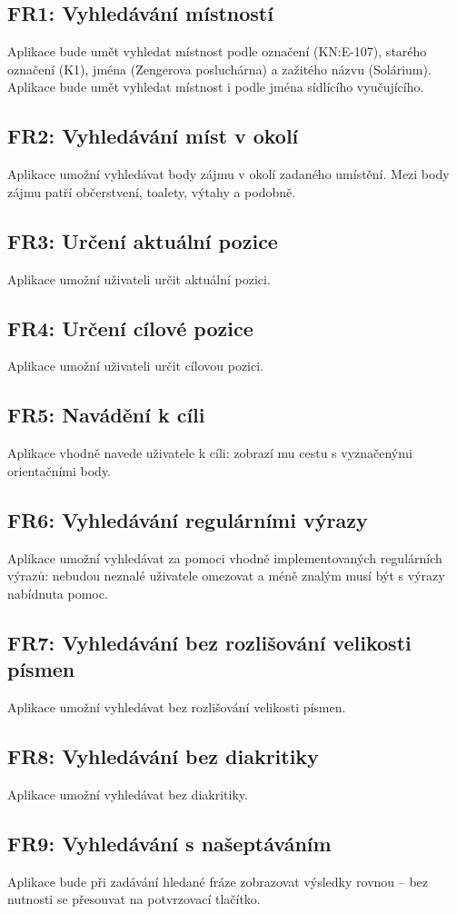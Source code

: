 \subsection{FR1: Vyhledávání místností}
Aplikace bude umět vyhledat místnost podle označení (KN:E-107), starého označení (K1), jména (Zengerova posluchárna) a zažitého názvu (Solárium). Aplikace bude umět vyhledat místnost i podle jména sídlícího vyučujícího.
\subsection{FR2: Vyhledávání míst v okolí}
Aplikace umožní vyhledávat body zájmu v okolí zadaného umístění. Mezi body zájmu patří občerstvení, toalety, výtahy a podobně.
\subsection{FR3: Určení aktuální pozice}
Aplikace umožní uživateli určit aktuální pozici.
\subsection{FR4: Určení cílové pozice}
Aplikace umožní uživateli určit cílovou pozici.
\subsection{FR5: Navádění k cíli}
Aplikace vhodně navede uživatele k cíli: zobrazí mu cestu s vyznačenými orientačními body.
\subsection{FR6: Vyhledávání regulárními výrazy}
Aplikace umožní vyhledávat za pomoci vhodně implementovaných regulárních výrazů: nebudou neznalé uživatele omezovat a méně znalým musí být s výrazy nabídnuta pomoc.
\subsection{FR7: Vyhledávání bez rozlišování velikosti písmen}
Aplikace umožní vyhledávat bez rozlišování velikosti písmen.
\subsection{FR8: Vyhledávání bez diakritiky}
Aplikace umožní vyhledávat bez diakritiky.
\subsection{FR9: Vyhledávání s našeptáváním}
Aplikace bude při zadávání hledané fráze zobrazovat výsledky rovnou -- bez nutnosti se přesouvat na potvrzovací tlačítko.
